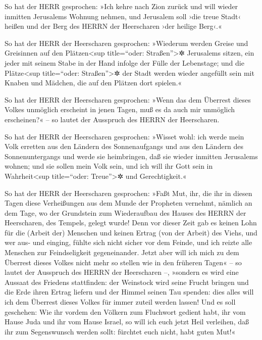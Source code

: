  So hat der HERR gesprochen: »Ich kehre nach Zion zurück
und will wieder inmitten Jerusalems Wohnung nehmen, und Jerusalem soll
›die treue Stadt‹ heißen und der Berg des HERRN der Heerscharen ›der
heilige Berg‹.«

 So hat der HERR der Heerscharen gesprochen: »Wiederum
werden Greise und Greisinnen auf den Plätzen\textless sup title=``oder:
Straßen''\textgreater✲ Jerusalems sitzen, ein jeder mit seinem Stabe in
der Hand infolge der Fülle der Lebenstage;  und die
Plätze\textless sup title=``oder: Straßen''\textgreater✲ der Stadt
werden wieder angefüllt sein mit Knaben und Mädchen, die auf den Plätzen
dort spielen.«

 So hat der HERR der Heerscharen gesprochen: »Wenn das dem
Überrest dieses Volkes unmöglich erscheint in jenen Tagen, muß es da
auch mir unmöglich erscheinen?« -- so lautet der Ausspruch des HERRN der
Heerscharen.

 So hat der HERR der Heerscharen gesprochen: »Wisset wohl:
ich werde mein Volk erretten aus den Ländern des Sonnenaufgangs und aus
den Ländern des Sonnenuntergangs  und werde sie
heimbringen, daß sie wieder inmitten Jerusalems wohnen; und sie sollen
mein Volk sein, und ich will ihr Gott sein in Wahrheit\textless sup
title=``oder: Treue''\textgreater✲ und Gerechtigkeit.«

 So hat der HERR der Heerscharen gesprochen: »Faßt Mut,
ihr, die ihr in diesen Tagen diese Verheißungen aus dem Munde der
Propheten vernehmt, nämlich an dem Tage, wo der Grundstein zum
Wiederaufbau des Hauses des HERRN der Heerscharen, des Tempels, gelegt
wurde!  Denn vor dieser Zeit gab es keinen Lohn für die
(Arbeit der) Menschen und keinen Ertrag (von der Arbeit) des Viehs, und
wer aus- und einging, fühlte sich nicht sicher vor dem Feinde, und ich
reizte alle Menschen zur Feindseligkeit gegeneinander. 
Jetzt aber will ich mich zu dem Überrest dieses Volkes nicht mehr so
stellen wie in den früheren Tagen« -- so lautet der Ausspruch des HERRN
der Heerscharen --,  »sondern es wird eine Aussaat des
Friedens stattfinden: der Weinstock wird seine Frucht bringen und die
Erde ihren Ertrag liefern und der Himmel seinen Tau spenden: dies alles
will ich dem Überrest dieses Volkes für immer zuteil werden lassen!
 Und es soll geschehen: Wie ihr vordem den Völkern zum
Fluchwort gedient habt, ihr vom Hause Juda und ihr vom Hause Israel, so
will ich euch jetzt Heil verleihen, daß ihr zum Segenswunsch werden
sollt: fürchtet euch nicht, habt guten Mut!«

